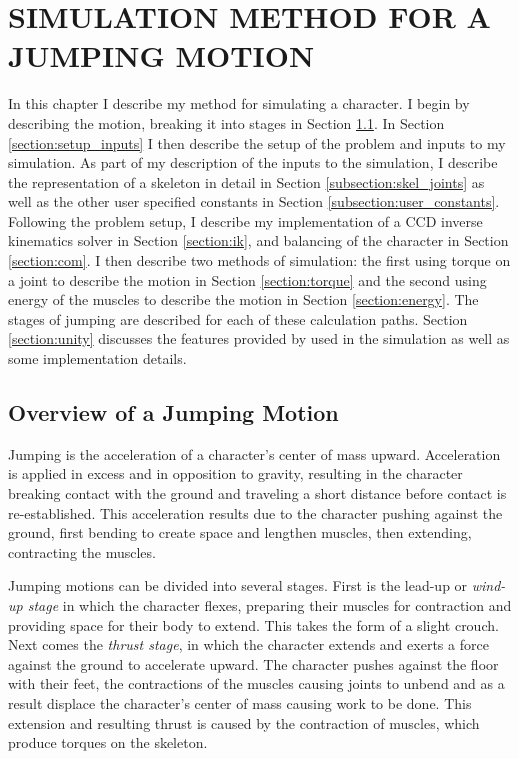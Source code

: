  
\chapter{SIMULATION METHOD FOR A JUMPING MOTION}
\label{chapter:animation}
In this chapter I describe my method for simulating a character.  I begin by describing the motion, breaking it into stages in Section \ref{section:motion_desc}.  In Section \ref{section:setup_inputs} I then describe the setup of the problem and inputs to my simulation.  As part of my description of the inputs to the simulation, I describe the representation of a skeleton in detail in Section \ref{subsection:skel_joints} as well as the other user specified constants in Section \ref{subsection:user_constants}.  Following the problem setup, I describe my implementation of a CCD inverse kinematics solver in Section \ref{section:ik}, and balancing of the character in Section \ref{section:com}.  I then describe two methods of simulation: the first using torque on a joint to describe the motion in Section \ref{section:torque} and the second using energy of the muscles to describe the motion in Section \ref{section:energy}.  The stages of jumping are described for each of these calculation paths. Section \ref{section:unity} discusses the features provided by \unity{} used in the simulation as well as some implementation details.

\section{Overview of a Jumping Motion}
\label{section:motion_desc}
Jumping is the acceleration of a character's center of mass upward.  Acceleration is applied in excess and in opposition to gravity, resulting in the character breaking contact with the ground and traveling a short distance before contact is re-established.  This acceleration results due to the character pushing against the ground, first bending to create space and lengthen muscles, then extending, contracting the muscles.

Jumping motions can be divided into several stages.  First is the lead-up or \emph{wind-up stage} in which the character flexes, preparing their muscles for contraction and providing space for their body to extend.  This takes the form of a slight crouch.  Next comes the \emph{thrust stage}, in which the character extends and exerts a force against the ground to accelerate upward.  The character pushes against the floor with their feet, the contractions of the muscles causing joints to unbend and as a result displace the character's center of mass causing work to be done.  This extension and resulting thrust is caused by the contraction of muscles, which produce torques on the skeleton.

